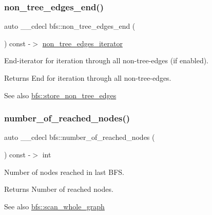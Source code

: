 \subsubsection{\texorpdfstring{non\+\_\+tree\+\_\+edges\+\_\+end()}{non\_tree\_edges\_end()}}
{\footnotesize\ttfamily auto \+\_\+\+\_\+cdecl bfs\+::non\+\_\+tree\+\_\+edges\+\_\+end (\begin{DoxyParamCaption}{ }\end{DoxyParamCaption}) const -\/$>$ \mbox{\hyperlink{classbfs_aecd86c7c1f1086d4b6b11c2a0eb12afe}{non\+\_\+tree\+\_\+edges\+\_\+iterator}}
	\hspace{0.3cm}{\ttfamily [inline]}}



End-\/iterator for iteration through all non-\/tree-\/edges (if enabled). 

\begin{DoxyReturn}{Returns}
End for iteration through all non-\/tree-\/edges. 
\end{DoxyReturn}
\begin{DoxySeeAlso}{See also}
\mbox{\hyperlink{classbfs_afed1aa751dbea4b6fb9dbdcea24b04f2}{bfs\+::store\+\_\+non\+\_\+tree\+\_\+edges}} 
\end{DoxySeeAlso}
\mbox{\label{classbfs_a98b86a661aa5284b77c260908f0872a0}} 
\subsubsection{\texorpdfstring{number\+\_\+of\+\_\+reached\+\_\+nodes()}{number\_of\_reached\_nodes()}}
{\footnotesize\ttfamily auto \+\_\+\+\_\+cdecl bfs\+::number\+\_\+of\+\_\+reached\+\_\+nodes (\begin{DoxyParamCaption}{ }\end{DoxyParamCaption}) const -\/$>$ int
	\hspace{0.3cm}{\ttfamily [inline]}}



Number of nodes reached in last B\+FS. 

\begin{DoxyReturn}{Returns}
Number of reached nodes. 
\end{DoxyReturn}
\begin{DoxySeeAlso}{See also}
\mbox{\hyperlink{classbfs_ac58d930764e6aa859fe706b1d916b9ad}{bfs\+::scan\+\_\+whole\+\_\+graph}} 
\end{DoxySeeAlso}
\mbox{\label{classbfs_a8cd9e96931e8b8c087f962eb9323dac4}} 

